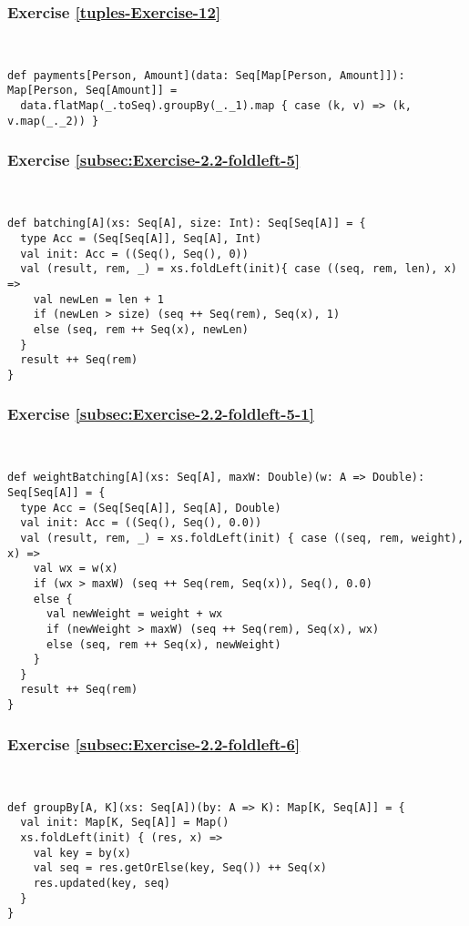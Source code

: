 \subsubsection*{Exercise \ref{tuples-Exercise-12}}

~
\begin{lstlisting}
def payments[Person, Amount](data: Seq[Map[Person, Amount]]): Map[Person, Seq[Amount]] =
  data.flatMap(_.toSeq).groupBy(_._1).map { case (k, v) => (k, v.map(_._2)) }
\end{lstlisting}


\subsubsection*{Exercise \ref{subsec:Exercise-2.2-foldleft-5}}

~
\begin{lstlisting}
def batching[A](xs: Seq[A], size: Int): Seq[Seq[A]] = {  
  type Acc = (Seq[Seq[A]], Seq[A], Int)
  val init: Acc = ((Seq(), Seq(), 0))
  val (result, rem, _) = xs.foldLeft(init){ case ((seq, rem, len), x) =>
    val newLen = len + 1
    if (newLen > size) (seq ++ Seq(rem), Seq(x), 1)
    else (seq, rem ++ Seq(x), newLen)
  }
  result ++ Seq(rem)
}
\end{lstlisting}


\subsubsection*{Exercise \ref{subsec:Exercise-2.2-foldleft-5-1}}

~
\begin{lstlisting}
def weightBatching[A](xs: Seq[A], maxW: Double)(w: A => Double): Seq[Seq[A]] = {  
  type Acc = (Seq[Seq[A]], Seq[A], Double)
  val init: Acc = ((Seq(), Seq(), 0.0))
  val (result, rem, _) = xs.foldLeft(init) { case ((seq, rem, weight), x) =>
    val wx = w(x)
    if (wx > maxW) (seq ++ Seq(rem, Seq(x)), Seq(), 0.0)
    else {
      val newWeight = weight + wx
      if (newWeight > maxW) (seq ++ Seq(rem), Seq(x), wx)
      else (seq, rem ++ Seq(x), newWeight)
    }
  }
  result ++ Seq(rem)
}
\end{lstlisting}


\subsubsection*{Exercise \ref{subsec:Exercise-2.2-foldleft-6}}

~
\begin{lstlisting}
def groupBy[A, K](xs: Seq[A])(by: A => K): Map[K, Seq[A]] = {  
  val init: Map[K, Seq[A]] = Map()
  xs.foldLeft(init) { (res, x) =>
    val key = by(x)
    val seq = res.getOrElse(key, Seq()) ++ Seq(x)
    res.updated(key, seq)
  }
}
\end{lstlisting}


